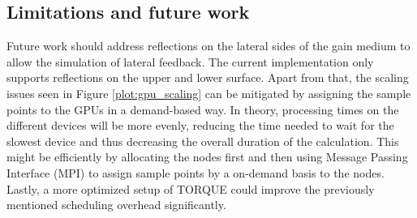 \subsection{Limitations and future work}
\label{subsec:limitations}
Future work should address reflections on the lateral sides of the gain medium
to allow the simulation of lateral feedback. The current implementation only
supports reflections on the upper and lower surface. Apart from that, the
scaling issues seen in Figure \ref{plot:gpu_scaling} can be mitigated by
assigning the sample points to the GPUs in a demand-based way. In theory,
processing times on the different devices will be more evenly, reducing the time
needed to wait for the slowest device and thus decreasing the overall duration
of the calculation. This might be efficiently by allocating the nodes first and
then using Message Passing Interface (MPI)\cite{MPI} to assign sample points by
a on-demand basis to the nodes. Lastly, a more optimized setup of TORQUE could
improve the previously mentioned scheduling overhead significantly.
